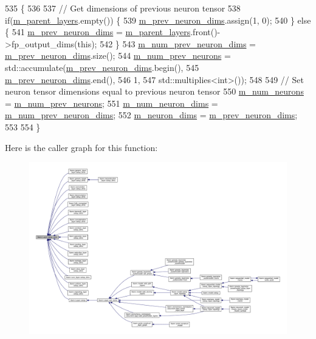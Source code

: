 \begin{DoxyCode}
535                        \{
536 
537   \textcolor{comment}{// Get dimensions of previous neuron tensor}
538   \textcolor{keywordflow}{if}(\hyperlink{classlbann_1_1Layer_a3fa7c6cf1a22bb14ab0e85e3dc6027c5}{m\_parent\_layers}.empty()) \{
539     \hyperlink{classlbann_1_1Layer_ae204d1a2a79606eaa117273857ff62a3}{m\_prev\_neuron\_dims}.assign(1, 0);
540   \} \textcolor{keywordflow}{else} \{
541     \hyperlink{classlbann_1_1Layer_ae204d1a2a79606eaa117273857ff62a3}{m\_prev\_neuron\_dims} = \hyperlink{classlbann_1_1Layer_a3fa7c6cf1a22bb14ab0e85e3dc6027c5}{m\_parent\_layers}.front()->fp\_output\_dims(\textcolor{keyword}{this});
542   \}
543   \hyperlink{classlbann_1_1Layer_adc052afb38f170e839db00d3c8151d1e}{m\_num\_prev\_neuron\_dims} = \hyperlink{classlbann_1_1Layer_ae204d1a2a79606eaa117273857ff62a3}{m\_prev\_neuron\_dims}.size();
544   \hyperlink{classlbann_1_1Layer_ac7b30f4e28d58204bfcbb76886f9136d}{m\_num\_prev\_neurons} = std::accumulate(\hyperlink{classlbann_1_1Layer_ae204d1a2a79606eaa117273857ff62a3}{m\_prev\_neuron\_dims}.begin(),
545                                        \hyperlink{classlbann_1_1Layer_ae204d1a2a79606eaa117273857ff62a3}{m\_prev\_neuron\_dims}.end(),
546                                        1,
547                                        std::multiplies<int>());
548   
549   \textcolor{comment}{// Set neuron tensor dimensions equal to previous neuron tensor}
550   \hyperlink{classlbann_1_1Layer_a6b5ebc8a7d9329d8a773ed787e7b41d8}{m\_num\_neurons} = \hyperlink{classlbann_1_1Layer_ac7b30f4e28d58204bfcbb76886f9136d}{m\_num\_prev\_neurons};
551   \hyperlink{classlbann_1_1Layer_adfd6178d21498c9095cd947ae1eb2d6a}{m\_num\_neuron\_dims} = \hyperlink{classlbann_1_1Layer_adc052afb38f170e839db00d3c8151d1e}{m\_num\_prev\_neuron\_dims};
552   \hyperlink{classlbann_1_1Layer_abb34bb8031f57a483e2e327a5f229f48}{m\_neuron\_dims} = \hyperlink{classlbann_1_1Layer_ae204d1a2a79606eaa117273857ff62a3}{m\_prev\_neuron\_dims};
553   
554 \}
\end{DoxyCode}
Here is the caller graph for this function\+:\nopagebreak
\begin{figure}[H]
\begin{center}
\leavevmode
\includegraphics[width=350pt]{classlbann_1_1Layer_a90fce1b06c1f2abb480e18cfe08a9746_icgraph}
\end{center}
\end{figure}
